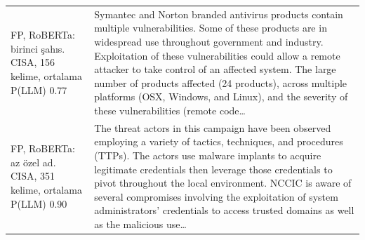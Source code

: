 \begin{table}[t]
\begin{tabular}{p{4.2cm}p{12.8cm}}
FP, RoBERTa: birinci şahıs. CISA, 156 kelime, ortalama P(LLM) 0.77 & Symantec and Norton branded antivirus products contain multiple vulnerabilities. Some of these products are in widespread use throughout government and industry. Exploitation of these vulnerabilities could allow a remote attacker to take control of an affected system. The large number of products affected (24 products), across multiple platforms (OSX, Windows, and Linux), and the severity of these vulnerabilities (remote code\ldots \\
FP, RoBERTa: az özel ad. CISA, 351 kelime, ortalama P(LLM) 0.90 & The threat actors in this campaign have been observed employing a variety of tactics, techniques, and procedures (TTPs). The actors use malware implants to acquire legitimate credentials then leverage those credentials to pivot throughout the local environment. NCCIC is aware of several compromises involving the exploitation of system administrators' credentials to access trusted domains as well as the malicious use\ldots \\
\bottomrule
\end{tabular}
\end{table}
